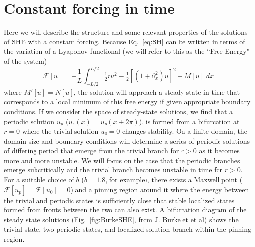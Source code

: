 \documentclass[../main/TimeForcingSHE.tex]{subfiles}
\begin{document}
\section{Constant forcing in time }

Here we will describe the structure and some relevant properties of the  solutions of SHE with a constant forcing.   Because Eq.~\ref{eq:SH} can be written in terms of the variation of a Lyaponov functional (we will refer to this as the ``Free Energy" of the system)
\begin{equation}
\mathcal{F}[u]=-\frac{1}{L}\int_{-L/2}^{L/2}\tfrac{1}{2}r u^2-\tfrac{1}{2}\left[(1+\partial_x^2)u\right]^2-M[u] \;dx
\end{equation}
where $M'[u]=N[u]$, the solution will approach a steady state in time that corresponds to a local minimum of this free energy if given appropriate boundary conditions.  If we consider the space of steady-state solutions, we find that a periodic solution $u_p$ ($u_p(x)=u_p(x+2\pi)$), is formed from a bifurcation at $r=0$ where the trivial solution $u_0=0$ changes stability.  On a finite domain, the domain size and boundary conditions will determine a series of periodic solutions of differing period that emerge from the trivial branch for $r>0$ as it becomes more and more unstable.   We will focus on the case that the periodic branches  emerge subcritically and the trivial branch becomes unstable in time for $r>0$.  For a suitable choice of $b$ ($b=1.8$, for example), there exists a Maxwell point ($\mathcal{F}[u_p]=\mathcal{F}[u_0]=0$) and a pinning region around it where the energy between the trivial and periodic states is sufficiently close that stable localized states formed from fronts between the two can also exist.  A bifurcation diagram of the steady state solutions (Fig.~\ref{fig:BurkeSHE}, from J. Burke et et al) shows the trivial state, two periodic states, and localized solution branch within the pinning region.  

\FIGshesnaking
\end{document}
